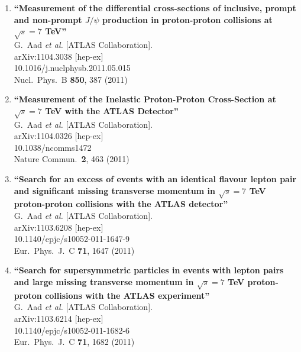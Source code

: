 \documentclass{article}
\begin{document}
\begin{enumerate}
\item%
{\bf ``Measurement of the differential cross-sections of inclusive, prompt and non-prompt $J/\psi$ production in proton-proton collisions at $\sqrt{s}=7$ TeV''}
  \\{}G.~Aad {\it et al.}  [ATLAS Collaboration].
  \\{}arXiv:1104.3038 [hep-ex]
    \\{}10.1016/j.nuclphysb.2011.05.015
\\{}Nucl.\ Phys.\ B {\bf 850}, 387 (2011) %


\item%
{\bf ``Measurement of the Inelastic Proton-Proton Cross-Section at $\sqrt{s}=7$ TeV with the ATLAS Detector''}
  \\{}G.~Aad {\it et al.}  [ATLAS Collaboration].
  \\{}arXiv:1104.0326 [hep-ex]
    \\{}10.1038/ncomms1472
\\{}Nature Commun.\  {\bf 2}, 463 (2011) %


\item%
{\bf ``Search for an excess of events with an identical flavour lepton pair and significant missing transverse momentum in $\sqrt{s}=7$ TeV proton-proton collisions with the ATLAS detector''}
  \\{}G.~Aad {\it et al.}  [ATLAS Collaboration].
  \\{}arXiv:1103.6208 [hep-ex]
    \\{}10.1140/epjc/s10052-011-1647-9
\\{}Eur.\ Phys.\ J.\ C {\bf 71}, 1647 (2011) %


\item%
{\bf ``Search for supersymmetric particles in events with lepton pairs and large missing transverse momentum in $\sqrt{s}=7$ TeV proton-proton collisions with the ATLAS experiment''}
  \\{}G.~Aad {\it et al.}  [ATLAS Collaboration].
  \\{}arXiv:1103.6214 [hep-ex]
    \\{}10.1140/epjc/s10052-011-1682-6
\\{}Eur.\ Phys.\ J.\ C {\bf 71}, 1682 (2011) %



\end{enumerate}
\end{document}
